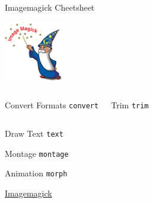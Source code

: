 \documentclass[hyperref={colorlinks,citecolor=pink,linkcolor=red,urlcolor=blue}]{beamer}
\begin{document}
\begin{frame}{Imagemagick Cheetsheet}


\includegraphics[width=1in]{Imagemagick-logo.png}

\begin{columns}[t]
		\begin{exampleblock}{Convert Formats}
			\texttt{convert}
		\end{exampleblock}	
		\begin{exampleblock}{Trim}
			\texttt{trim}
		\end{exampleblock}
\end{columns}

\begin{exampleblock}{Draw Text}
	\texttt{text}
\end{exampleblock}

\begin{exampleblock}{Montage}
	\texttt{montage}
\end{exampleblock}

\begin{exampleblock}{Animation}
	\texttt{morph}
\end{exampleblock}

\href{http://www.imagemagick.org}{Imagemagick}
\end{frame}
\end{document}
